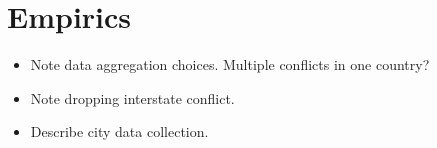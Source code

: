 \section{Empirics}
\label{empirics}

\begin{itemize}
	\item Note data aggregation choices.  Multiple conflicts in one country?
	\item Note dropping interstate conflict.
	\item Describe city data collection.
\end{itemize}